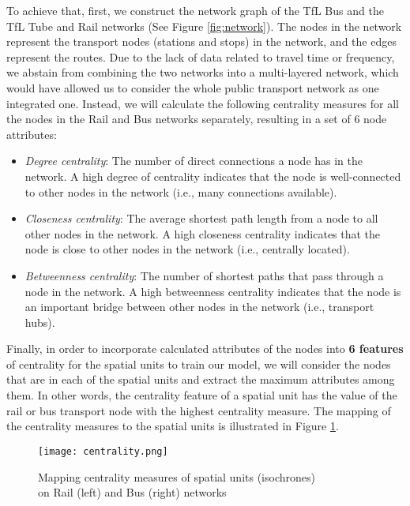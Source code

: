 To achieve that, first, we construct the network graph of the TfL Bus and the TfL Tube and Rail networks (See Figure \ref{fig:network}). The nodes in the network represent the transport nodes (stations and stops) in the network, and the edges represent the routes. Due to the lack of data related to travel time or frequency, we abstain from combining the two networks into a multi-layered network, which would have allowed us to consider the whole public transport network as one integrated one. Instead, we will calculate the following centrality measures for all the nodes in the Rail and Bus networks separately, resulting in a set of 6 node attributes:

\begin{itemize}
    \setlength\itemsep{0em}
    \item \textit{Degree centrality}: The number of direct connections a node has in the network. A high degree of centrality indicates that the node is well-connected to other nodes in the network (i.e., many connections available).
    \item \textit{Closeness centrality}: The average shortest path length from a node to all other nodes in the network. A high closeness centrality indicates that the node is close to other nodes in the network (i.e., centrally located). 
    \item \textit{Betweenness centrality}: The number of shortest paths that pass through a node in the network. A high betweenness centrality indicates that the node is an important bridge between other nodes in the network (i.e., transport hubs).
\end{itemize}

Finally, in order to incorporate calculated attributes of the nodes into \textbf{6 features} of centrality for the spatial units to train our model, we will consider the nodes that are in each of the spatial units and extract the maximum attributes among them. In other words, the centrality feature of a spatial unit has the value of the rail or bus transport node with the highest centrality measure. The mapping of the centrality measures to the spatial units is illustrated in Figure \ref{fig:centrality}.

\begin{figure}[!ht]
    \centering
    \texttt{[image: centrality.png]}
    \captionsetup{justification=centering}
    \caption{Mapping centrality measures of spatial units (isochrones)\\on Rail (left) and Bus (right) networks}
    \label{fig:centrality}
\end{figure}

